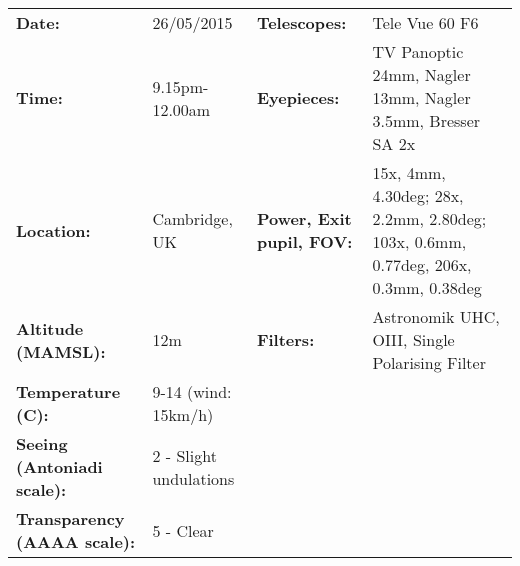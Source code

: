 \begin{tabular}{ p{1.7in} p{1.2in} p{1.5in} p{4.2in}}
{\bf Date:} & 26/05/2015 & {\bf Telescopes:} & Tele Vue 60 F6 \\ 
{\bf Time:} & 9.15pm-12.00am & {\bf Eyepieces:} & TV Panoptic 24mm, Nagler 13mm, Nagler 3.5mm, Bresser SA 2x \\ 
{\bf Location:} & Cambridge, UK & {\bf Power, Exit pupil, FOV:} & 15x, 4mm, 4.30deg; 28x, 2.2mm, 2.80deg; 103x, 0.6mm, 0.77deg, 206x, 0.3mm, 0.38deg \\ 
{\bf Altitude (MAMSL):} & 12m & {\bf Filters:} & Astronomik UHC, OIII, Single Polarising Filter \\ 
{\bf Temperature (C):} & 9-14 (wind: 15km/h) & & \\ 
{\bf Seeing (Antoniadi scale):} & 2 - Slight undulations & & \\ 
{\bf Transparency (AAAA scale):} & 5 - Clear & & \\ 
\end{tabular}
\centering 
